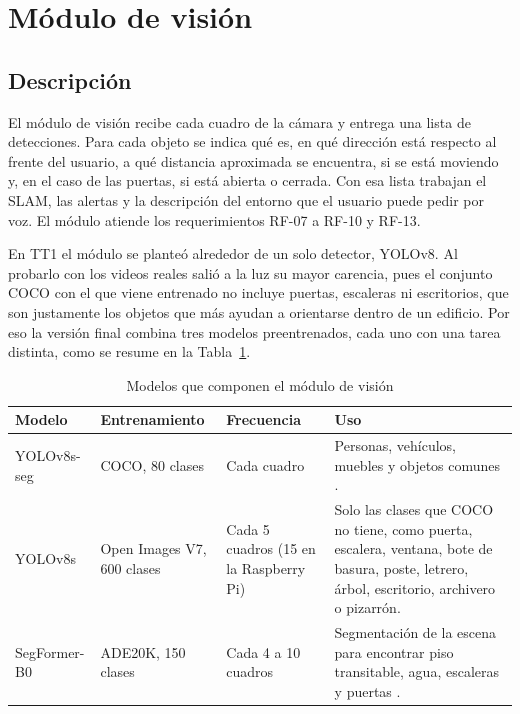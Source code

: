 \section{Módulo de visión}
\label{sec:dev_vision}

\subsection{Descripción}

El módulo de visión recibe cada cuadro de la cámara y entrega una lista de
detecciones. Para cada objeto se indica qué es, en qué dirección está respecto al frente
del usuario, a qué distancia aproximada se encuentra, si se está moviendo y, en el caso
de las puertas, si está abierta o cerrada. Con esa lista trabajan el SLAM, las alertas y
la descripción del entorno que el usuario puede pedir por voz. El módulo atiende los
requerimientos RF-07 a RF-10 y RF-13.

En TT1 el módulo se planteó alrededor de un solo detector, YOLOv8. Al probarlo con los
videos reales salió a la luz su mayor carencia, pues el conjunto COCO con el que viene
entrenado no incluye puertas, escaleras ni escritorios, que son justamente los objetos
que más ayudan a orientarse dentro de un edificio. Por eso la versión final combina tres
modelos preentrenados, cada uno con una tarea distinta, como se resume en la
Tabla~\ref{tab:vision_modelos}.

\begin{table}[H]
\centering
\caption{Modelos que componen el módulo de visión}
\label{tab:vision_modelos}
\renewcommand{\arraystretch}{1.25}
\begin{tabular}{|p{3.4cm}|p{3.1cm}|p{2.3cm}|p{5.7cm}|}
\hline
\textbf{Modelo} & \textbf{Entrenamiento} & \textbf{Frecuencia} & \textbf{Uso} \\
\hline
YOLOv8s-seg & COCO, 80 clases & Cada cuadro & Personas, vehículos, muebles y objetos
comunes \cite{redmon2016yolo}. \\
\hline
YOLOv8s & Open Images V7, 600 clases & Cada 5 cuadros (15 en la Raspberry Pi) & Solo
las clases que COCO no tiene, como puerta, escalera, ventana, bote de basura, poste,
letrero, árbol, escritorio, archivero o pizarrón. \\
\hline
SegFormer-B0 & ADE20K, 150 clases & Cada 4 a 10 cuadros & Segmentación de la escena
para encontrar piso transitable, agua, escaleras y puertas \cite{xie2021segformer,
zhou2017ade20k}. \\
\hline
\end{tabular}
\end{table}

